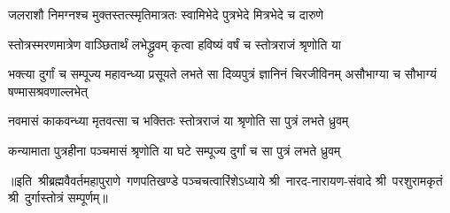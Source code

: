 \twolineshloka
{जलराशौ निमग्नश्च मुक्तस्तत्स्मृतिमात्रतः}
{स्वामिभेदे पुत्रभेदे मित्रभेदे च दारुणे}

\twolineshloka
{स्तोत्रस्मरणमात्रेण वाञ्छितार्थं लभेद्ध्रुवम्}
{कृत्वा हविष्यं वर्षं च स्तोत्रराजं श्रृणोति या}

\threelineshloka
{भक्त्या दुर्गां च सम्पूज्य महावन्ध्या प्रसूयते}
{लभते सा दिव्यपुत्रं ज्ञानिनं चिरजीविनम्}
{असौभाग्या च सौभाग्यं षण्मासश्रवणाल्लभेत्}

\twolineshloka
{नवमासं काकवन्ध्या मृतवत्सा च भक्तितः}
{स्तोत्रराजं या श्रृणोति सा पुत्रं लभते ध्रुवम्}

\twolineshloka
{कन्यामाता पुत्रहीना पञ्चमासं श्रृणोति या}
{घटे सम्पूज्य दुर्गां च सा पुत्रं लभते ध्रुवम्}


{॥इति~श्रीब्रह्मवैवर्तमहापुराणे~गणपतिखण्डे पञ्चचत्वारिंशेऽध्याये श्री~नारद-नारायण-संवादे श्री~परशुरामकृतं श्री~दुर्गास्तोत्रं सम्पूर्णम्॥}